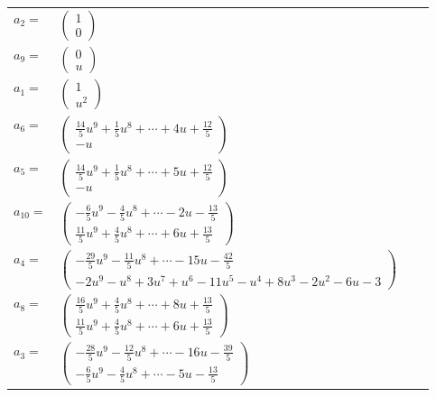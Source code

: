 \documentclass[1p]{elsarticle_modified}
\theoremstyle{definition}
\begin{document}
\begin{tabular}{m{7pt} m{180pt} m{7pt} m{180pt} }
\flushright $a_{2}=$&$\begin{pmatrix}1\\0\end{pmatrix}$ \\
\flushright $a_{9}=$&$\begin{pmatrix}0\\u\end{pmatrix}$ \\
\flushright $a_{1}=$&$\begin{pmatrix}1\\u^2\end{pmatrix}$ \\
\flushright $a_{6}=$&$\begin{pmatrix}\frac{14}{5} u^9+\frac{1}{5} u^8+\cdots+4 u+\frac{12}{5}\\- u\end{pmatrix}$ \\
\flushright $a_{5}=$&$\begin{pmatrix}\frac{14}{5} u^9+\frac{1}{5} u^8+\cdots+5 u+\frac{12}{5}\\- u\end{pmatrix}$ \\
\flushright $a_{10}=$&$\begin{pmatrix}-\frac{6}{5} u^9-\frac{4}{5} u^8+\cdots-2 u-\frac{13}{5}\\\frac{11}{5} u^9+\frac{4}{5} u^8+\cdots+6 u+\frac{13}{5}\end{pmatrix}$ \\
\flushright $a_{4}=$&$\begin{pmatrix}-\frac{29}{5} u^9-\frac{11}{5} u^8+\cdots-15 u-\frac{42}{5}\\-2 u^9- u^8+3 u^7+u^6-11 u^5- u^4+8 u^3-2 u^2-6 u-3\end{pmatrix}$ \\
\flushright $a_{8}=$&$\begin{pmatrix}\frac{16}{5} u^9+\frac{4}{5} u^8+\cdots+8 u+\frac{13}{5}\\\frac{11}{5} u^9+\frac{4}{5} u^8+\cdots+6 u+\frac{13}{5}\end{pmatrix}$ \\
\flushright $a_{3}=$&$\begin{pmatrix}-\frac{28}{5} u^9-\frac{12}{5} u^8+\cdots-16 u-\frac{39}{5}\\-\frac{6}{5} u^9-\frac{4}{5} u^8+\cdots-5 u-\frac{13}{5}\end{pmatrix}$ \\

\end{tabular}
\end{document}
